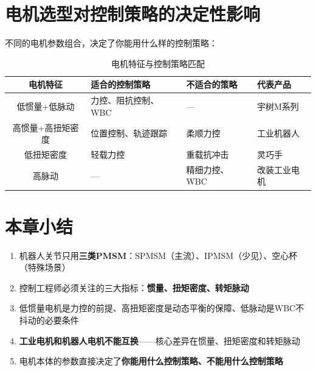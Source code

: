 \section{电机选型对控制策略的决定性影响}

不同的电机参数组合，决定了你能用什么样的控制策略：

\begin{table}[H]
\centering
\begin{tabular}{cp{3.5cm}p{3.5cm}p{3.5cm}}
\toprule
\textbf{电机特征} & \textbf{适合的控制策略} & \textbf{不适合的策略} & \textbf{代表产品} \\
\midrule
低惯量+低脉动 & 力控、阻抗控制、WBC & --- & 宇树M系列 \\
高惯量+高扭矩密度 & 位置控制、轨迹跟踪 & 柔顺力控 & 工业机器人 \\
低扭矩密度 & 轻载力控 & 重载抗冲击 & 灵巧手 \\
高脉动 & --- & 精细力控、WBC & 改装工业电机 \\
\bottomrule
\end{tabular}
\caption{电机特征与控制策略匹配}
\label{tab:motor_ctrl_match}
\end{table}

\section*{本章小结}

\begin{summarybox}{}
\begin{enumerate}
  \item 机器人关节只用\textbf{三类PMSM}：SPMSM（主流）、IPMSM（少见）、空心杯（特殊场景）
  \item 控制工程师必须关注的三大指标：\textbf{惯量、扭矩密度、转矩脉动}
  \item 低惯量电机是力控的前提、高扭矩密度是动态平衡的保障、低脉动是WBC不抖动的必要条件
  \item \textbf{工业电机和机器人电机不能互换}——核心差异在惯量、扭矩密度和转矩脉动
  \item 电机本体的参数直接决定了\textbf{你能用什么控制策略、不能用什么控制策略}
\end{enumerate}
\end{summarybox}

\newpage
